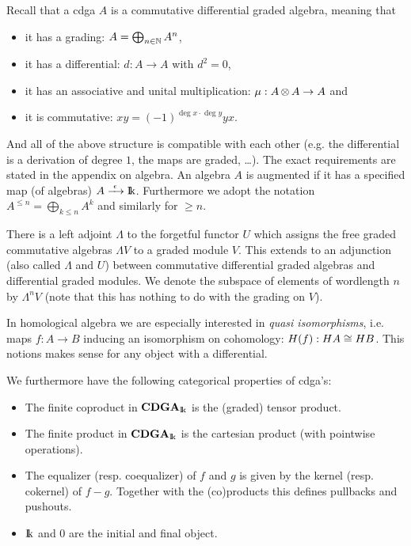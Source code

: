 

Recall that a cdga $A$ is a commutative differential graded algebra, meaning that
\begin{itemize}
	\item it has a grading: $A = \bigoplus_{n\in\mathbb{N}} A^n$,
	\item it has a differential: $d: A \to A$ with $d^2 = 0$,
	\item it has an associative and unital multiplication: $\mu: A \operatorname*{\otimes} A \to A$ and
	\item it is commutative: $x y = (-1)^{\deg{x}\cdot\deg{y}} y x$.
\end{itemize}
And all of the above structure is compatible with each other (e.g. the differential is a derivation of degree $1$, the maps are graded, \dots). The exact requirements are stated in the appendix on algebra. An algebra $A$ is augmented if it has a specified map (of algebras) $A \xrightarrow{\,\,{\epsilon}\,\,} \mathrm{I\!k}$. Furthermore we adopt the notation $A^{\leq n} = \bigoplus_{k \leq n} A^k$ and similarly for $\geq n$.

There is a left adjoint $\Lambda$ to the forgetful functor $U$ which assigns the free graded commutative algebras $\Lambda V$ to a graded module $V$. This extends to an adjunction (also called $\Lambda$ and $U$) between commutative differential graded algebras and differential graded modules. We denote the subspace of elements of wordlength $n$ by $\Lambda^n V$ (note that this has nothing to do with the grading on $V$).

In homological algebra we are especially interested in \emph{quasi isomorphisms}, i.e. maps $f: A \to B$ inducing an isomorphism on cohomology: $H(f): HA \cong HB$. This notions makes sense for any object with a differential.

We furthermore have the following categorical properties of cdga's:
\begin{itemize}
	\item The finite coproduct in $\mathbf{CDGA}_{\mathrm{I\!k}}$ is the (graded) tensor product.
	\item The finite product in $\mathbf{CDGA}_{\mathrm{I\!k}}$ is the cartesian product (with pointwise operations).
	\item The equalizer (resp. coequalizer) of $f$ and $g$ is given by the kernel (resp. cokernel) of $f - g$. Together with the (co)products this defines pullbacks and pushouts.
	\item $\mathrm{I\!k}$ and $0$ are the initial and final object.
\end{itemize}

